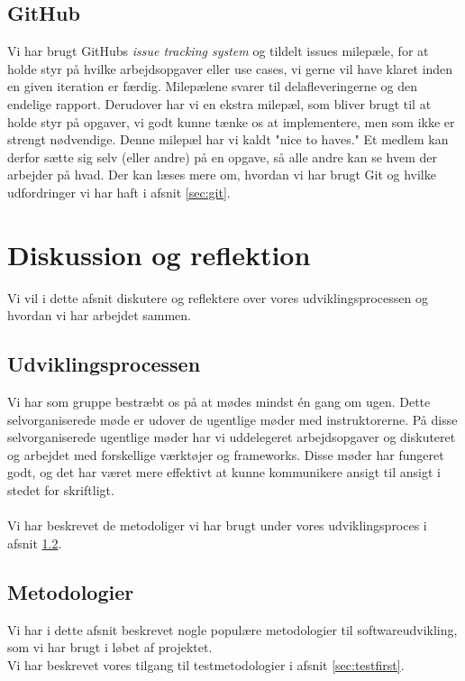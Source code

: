 \documentclass[12pt]{article}
\begin{document}
\subsection{GitHub}
Vi har brugt GitHubs \textit{issue tracking system}\cite{issuetracking} og tildelt issues milepæle, for at holde styr på hvilke arbejdsopgaver eller use cases, vi gerne vil have klaret inden en given iteration er færdig. Milepælene svarer til delafleveringerne og den endelige rapport. Derudover har vi en ekstra milepæl, som bliver brugt til at holde styr på opgaver, vi godt kunne tænke os at implementere, men som ikke er strengt nødvendige. Denne milepæl har vi kaldt "nice to haves."{} Et medlem kan derfor sætte sig selv (eller andre) på en opgave, så alle andre kan se hvem der arbejder på hvad. Der kan læses mere om, hvordan vi har brugt Git og hvilke udfordringer vi har haft i afsnit \ref{sec:git}.

\section{Diskussion og reflektion}
\label{sec:diskussion}
Vi vil i dette afsnit diskutere og reflektere over vores udviklingsprocessen og hvordan vi har arbejdet sammen.

\subsection{Udviklingsprocessen}
Vi har som gruppe bestræbt os på at mødes mindst én gang om ugen. Dette selvorganiserede møde er udover de ugentlige møder med instruktorerne. På disse selvorganiserede ugentlige møder har vi uddelegeret arbejdsopgaver og diskuteret og arbejdet med forskellige værktøjer og frameworks. Disse møder har fungeret godt, og det har været mere effektivt at kunne kommunikere ansigt til ansigt i stedet for skriftligt.\\
\\
Vi har beskrevet de metodoliger vi har brugt under vores udviklingsproces i afsnit \ref{sec:methodologies}.

\subsection{Metodologier}
\label{sec:methodologies}
Vi har i dette afsnit beskrevet nogle populære metodologier til softwareudvikling, som vi har brugt i løbet af projektet.\\
Vi har beskrevet vores tilgang til testmetodologier i afsnit \ref{sec:testfirst}.
\end{document}
